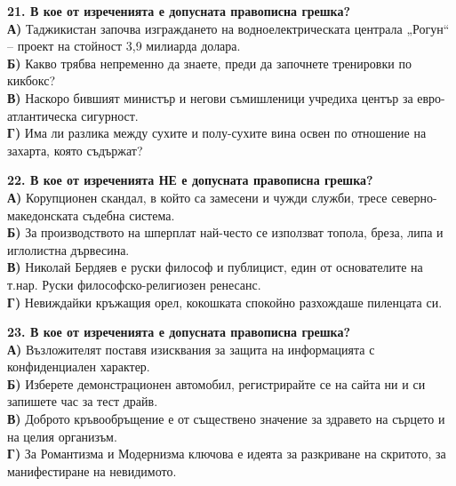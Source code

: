 \documentclass[12pt,a4paper]{article}
\begin{document}
\vspace{0.6cm}

\noindent
\textbf{21. В кое от изреченията е допусната правописна грешка?} \\
\noindent
\textbf{А)} Таджикистан започва изграждането на водноелектрическата централа „Рогун“ -- проект на стойност 3,9 милиарда долара. \\
\textbf{Б)} Какво трябва непременно да знаете, преди да започнете тренировки по кикбокс? \\
\textbf{В)} Наскоро бившият министър и негови съмишленици учредиха център за евро-атлантическа сигурност. \\
\textbf{Г)} Има ли разлика между сухите и полу-сухите вина освен по отношение на захарта, която съдържат?

\vspace{0.6cm}

\noindent
\textbf{22. В кое от изреченията НЕ е допусната правописна грешка?} \\
\noindent
\textbf{А)} Корупционен скандал, в който са замесени и чужди служби, тресе северно-македонската съдебна система. \\
\textbf{Б)} За производството на шперплат най-често се използват топола, бреза, липа и иглолистна дървесина. \\
\textbf{В)} Николай Бердяев е руски философ и публицист, един от основателите на т.нар. Руски философско-религиозен ренесанс. \\
\textbf{Г)} Невиждайки кръжащия орел, кокошката спокойно разхождаше пиленцата си.

\vspace{0.6cm}

\noindent
\textbf{23. В кое от изреченията е допусната правописна грешка?} \\
\noindent
\textbf{А)} Възложителят поставя изисквания за защита на информацията с конфиденциален характер. \\
\textbf{Б)} Изберете демонстрационен автомобил, регистрирайте се на сайта ни и си запишете час за тест драйв. \\
\textbf{В)} Доброто кръвообръщение е от съществено значение за здравето на сърцето и на целия организъм. \\
\textbf{Г)} За Романтизма и Модернизма ключова е идеята за разкриване на скритото, за манифестиране на невидимото.

\newpage

\vspace{0.6cm}
\end{document}
